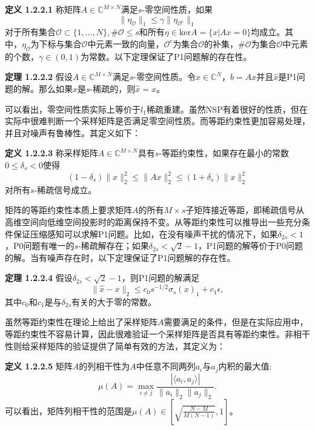 \noindent\textbf{定义 1.2.2.1} 称矩阵$A\in \mathbb{C}^{M\times N}$满足$s$-零空间性质，如果
$$\|\eta_\mathcal{O}\|_1\leq \gamma\|\eta_{\mathcal{O}^c}\|_1$$
对于所有集合$\mathcal{O}\subset\{1,...,N\},\#\mathcal{O}\leq s$和所有$\eta\in \mathrm{ker}A=\{x|Ax=0\}$均成立。其中，$\eta_\mathcal{O}$为下标与集合$\mathcal{O}$中元素一致的向量，$\mathcal{O}^c$为集合$\mathcal{O}$的补集，$\#\mathcal{O}$为集合$\mathcal{O}$中元素的个数，$\gamma\in (0,1)$为常数。以下定理保证了P1问题解的存在性。

\noindent\textbf{定理 1.2.2.2} 假设$A\in \mathbb{C}^{M\times N}$满足$s$-零空间性质。令$x\in \mathbb{C}^N$，$b=Ax$并且$\hat{x}$是P1问题的解。那么如果$x$是$s$-稀疏的，则$\hat{x}=x$。

可以看出，零空间性质实际上等价于$l_1$稀疏重建。虽然NSP有着很好的性质，但在实际中很难判断一个采样矩阵是否满足零空间性质。而等距约束性更加容易处理，并且对噪声有鲁棒性。其定义如下：

\noindent\textbf{定义 1.2.2.3} 称采样矩阵$A\in \mathbb{C}^{M\times N}$具有$s$-等距约束性，如果存在最小的常数$0\leq\delta_s<0$使得
\begin{equation}
	(1-\delta_s)\|x\|_2^2\leq \|Ax\|_2^2\leq (1+\delta_s)\|x\|^2_2
\end{equation}
对所有$s$-稀疏信号成立。

矩阵的等距约束性本质上要求矩阵$A$的所有$M\times s$子矩阵接近等距，即稀疏信号从高维空间向低维空间投影时的距离保持不变。从等距约束性可以推导出一些充分条件保证压缩感知可以求解P1问题。比如，在没有噪声干扰的情况下，如果$\delta_{2s}<1$，P0问题有唯一的$s$-稀疏解存在；如果$\delta_{2s}<\sqrt{2}-1$，P1问题的解等价于P0问题的解。当有噪声存在时，以下定理保证了P1问题解的存在性。

\noindent\textbf{定理 1.2.2.4} 假设$\delta_{2s}<\sqrt{2}-1$，则P1问题的解满足
$$\|\hat{x}-x\|_2\leq c_0s^{-1/2}\sigma_s(x)_1+c_1\epsilon,$$
其中$c_0$和$c_1$是与$\delta_{2s}$有关的大于零的常数。

虽然等距约束性在理论上给出了采样矩阵$A$需要满足的条件，但是在实际应用中，等距约束性不容易计算，因此很难验证一个采样矩阵是否具有等距约束性。非相干性则给采样矩阵的验证提供了简单有效的方法，其定义为：

\noindent\textbf{定义 1.2.2.5} 
矩阵$A$的列相干性为$A$中任意不同两列$a_i$与$a_j$内积的最大值:
\begin{equation}
	\mu(A) = \max_{i\neq j}\frac{|\langle a_i,a_j\rangle|}{\|a_i\|_2\|a_j\|_2}.
\end{equation}
可以看出，矩阵列相干性的范围是$\mu(A)\in [\sqrt{\frac{N-M}{M(N-1)}},1]$。

